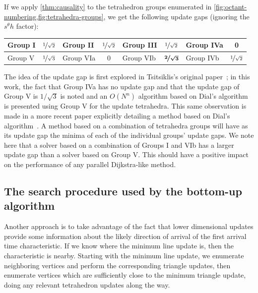 \documentclass{article}
\begin{document}
If we apply \cref{thm:causality} to the tetrahedron groups enumerated
in \cref{fig:octant-numbering,fig:tetrahedra-groups}, we get the
following update gaps (ignoring the $s^\theta h$ factor):
\vspace{0.5em}
\begin{center}
  \begin{tabular}{lc|lc|lc|lc}
    Group I & $\nicefrac{1}{\sqrt{2}}$ & Group II & $\nicefrac{1}{\sqrt{2}}$ & Group III & $\nicefrac{1}{\sqrt{2}}$ & Group IVa & 0 \\
    \midrule
    Group V & $\nicefrac{1}{\sqrt{3}}$ & Group VIa & 0 & Group VIb & $\boldsymbol{\nicefrac{2}{\sqrt{3}}}$ & Group IVb & $\nicefrac{1}{\sqrt{2}}$
  \end{tabular}
\end{center}
\vspace{0.5em} The idea of the update gap is first explored in
Tsitsiklis's original paper~\cite{tsitsiklis1995efficient}; in this
work, the fact that Group IVa has no update gap and that the update
gap of Group V is $1/\sqrt{3}$ is noted and an $O(N^n)$ algorithm
based on Dial's algorithm is presented using Group V for the update
tetrahedra. This same observation is made in a more recent paper
explicitly detailing a method based on Dial's
algorithm~\cite{kim2001calo}. A method based on a combination of
tetrahedra groups will have as its update gap the minima of each of
the individual groups' update gaps. We note here that a solver based
on a combination of Groups I and VIb has a larger update gap than a
solver based on Group V. This should have a positive impact on the
performance of any parallel Dijkstra-like method.

\subsection{The search procedure used by the bottom-up
  algorithm}\label{ssec:bottom-up-search}

Another approach is to take advantage of the fact that lower
dimensional updates provide some information about the likely
direction of arrival of the first arrival time characteristic. If we
know where the minimum line update is, then the characteristic is
nearby. Starting with the minimum line update, we enumerate
neighboring vertices and perform the corresponding triangle updates,
then enumerate vertices which are sufficiently close to the minimum
triangle update, doing any relevant tetrahedron updates along the way.
\end{document}
